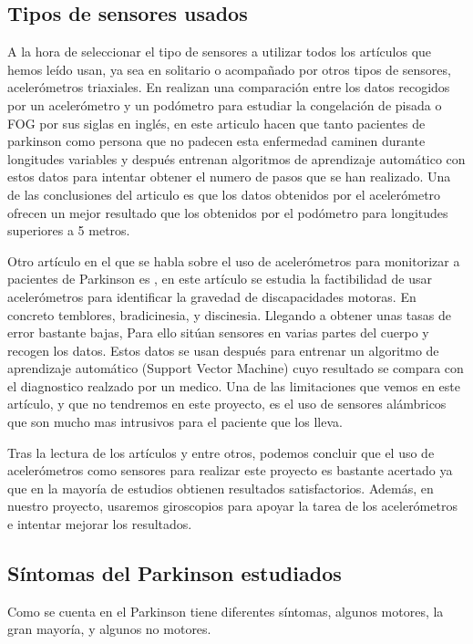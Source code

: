 \subsection{Tipos de sensores usados}
A la hora de seleccionar el tipo de sensores a utilizar todos los artículos que hemos leído usan, ya sea en solitario o acompañado por otros tipos de sensores, acelerómetros triaxiales. En \cite{resumen3} realizan una comparación entre los datos recogidos por un acelerómetro y un podómetro para estudiar la congelación de pisada o FOG por sus siglas en inglés, en este articulo hacen que tanto pacientes de parkinson como persona que no padecen esta enfermedad caminen durante longitudes variables y después entrenan algoritmos de aprendizaje automático con estos datos para intentar obtener el numero de pasos que se han realizado. Una de las conclusiones del articulo es que los datos obtenidos por el acelerómetro ofrecen un mejor resultado que los obtenidos por el podómetro para longitudes superiores a 5 metros. 
\newline

Otro artículo en el que se habla sobre el uso de acelerómetros para monitorizar a pacientes de Parkinson es \cite{resumen4}, en este artículo se estudia la factibilidad de usar acelerómetros para identificar la gravedad de discapacidades motoras. En concreto temblores, bradicinesia, y discinesia. Llegando a obtener unas tasas de error bastante bajas, Para ello sitúan sensores en varias partes del cuerpo y recogen los datos. Estos datos se usan después para entrenar un algoritmo de aprendizaje automático (Support Vector Machine) cuyo resultado se compara con el diagnostico realzado por un medico. Una de las limitaciones que vemos en este artículo, y que no tendremos en este proyecto, es el uso de sensores alámbricos que son mucho mas intrusivos para el paciente que los lleva.

Tras la lectura de los artículos \cite{resumen3} y \cite{resumen4} entre otros, podemos concluir que el uso de acelerómetros como sensores para realizar este proyecto es bastante acertado ya que en la mayoría de estudios obtienen resultados satisfactorios. Además, en nuestro proyecto, usaremos giroscopios para apoyar la tarea de los acelerómetros e intentar mejorar los resultados.

\subsection{Síntomas del Parkinson estudiados}
Como se cuenta en \cite{resumen2} el Parkinson tiene diferentes síntomas, algunos motores, la gran mayoría, y algunos no motores. 
\newline

